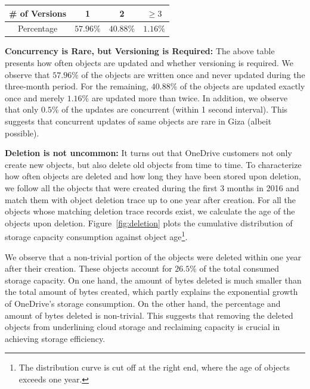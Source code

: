 \begin{table}[h]
\footnotesize
\centering
\begin{tabular}{c||c|c|c}
\# of Versions 	& 	1				& 2					& $\ge 3$
\\ \hline
Percentage			& $57.96\%$	& $40.88\%$	& $1.16\%$
\end{tabular}
\label{tab:version}
\end{table}
{\bf Concurrency is Rare, but Versioning is Required:} The above table presents how often objects are updated and whether versioning is required. We observe that $57.96\%$ of the objects are written once and never updated during the three-month period. For the remaining, $40.88\%$ of the objects are updated exactly once and merely $1.16\%$ are updated more than twice. In addition, we observe that only $0.5\%$ of the updates
are concurrent (within 1 second interval). This suggests that concurrent updates of same objects are rare in Giza (albeit possible).

{\bf Deletion is not uncommon:} It turns out that OneDrive customers not only
create new objects, but also delete old objects from time to time. To
characterize how often objects are deleted and how long they have been stored
upon deletion, we follow all the objects that were created during the first 3
months in 2016 and match them with object deletion trace up to one year after
creation. For all the objects whose matching deletion trace records exist, we
calculate the age of the objects upon deletion. Figure~\ref{fig:deletion} plots
the cumulative distribution of storage capacity consumption against object
age\footnote{The distribution curve is cut off at the right end, where the age of
objects exceeds one year.}.

We observe that a non-trivial portion of the objects were deleted within one
year after their creation. These objects account for $26.5\%$ of the total
consumed storage capacity. On one hand, the amount of bytes deleted is much
smaller than the total amount of bytes created, which partly explains the
exponential growth of OneDrive's storage consumption. On the other
hand, the percentage and amount of bytes deleted is non-trivial. This suggests
that removing the deleted objects from underlining cloud storage and reclaiming
capacity is crucial in achieving storage efficiency.


